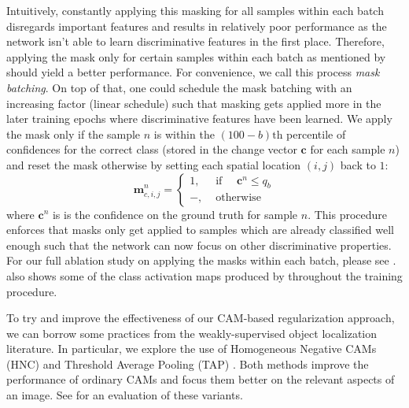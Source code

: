Intuitively, constantly applying this masking for all samples within each batch disregards important features and results in relatively poor performance as the network isn't able to learn discriminative features in the first place. Therefore, applying the mask only for certain samples within each batch as mentioned by \citet[Secton~3.3]{huang2020selfchallenging} should yield a better performance. For convenience, we call this process \emph{mask batching}. On top of that, one could schedule the mask batching with an increasing factor (\eg linear schedule) such that masking gets applied more in the later training epochs where discriminative features have been learned. We apply the mask only if the sample $n$ is within the $(100-b)\mathrm{th}$ percentile of confidences for the correct class (stored in the change vector $\mathbf{c}$ for each sample $n$) and reset the mask otherwise by setting each spatial location $(i,j)$ back to $1$:
\begin{equation}
    \mathbf{m}^n_{c,i,j}=\left\{\begin{array}{ll}
1, & \text { if } \quad \mathbf{c}^n \leq q_{b} \\
-, & \text { otherwise }
\end{array}\right.
\label{eq:MaskingReversion}
\end{equation}
 where $ \mathbf{c}^n$ is is the confidence on the ground truth for sample $n$. This procedure enforces that masks only get applied to samples which are already classified well enough such that the network can now focus on other discriminative properties. For our full ablation study on applying the masks within each batch, please see .  also shows some of the class activation maps produced by \divcam throughout the training procedure.

To try and improve the effectiveness of our CAM-based regularization approach, we can borrow some practices from the weakly-supervised object localization literature. In particular, we explore the use of Homogeneous Negative CAMs (HNC) \citep{sun2020fixing} and Threshold Average Pooling (TAP) \citep{Bae2020RethinkingCAM}. Both methods improve the performance of ordinary CAMs and focus them better on the relevant aspects of an image. See  for an evaluation of these variants.


